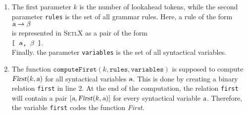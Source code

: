 \begin{enumerate}
\item The first parameter $k$ is the number of lookahead tokens, while the second parameter
      \texttt{rules} is the set of all grammar rules. Here, a rule of the form
      \\[0.2cm]
      \hspace*{1.3cm}
      $\textsl{a} \rightarrow \beta$
      \\[0.2cm]
      is represented in \textsc{SetlX} as a pair of the form
      \\[0.2cm]
      \hspace*{1.3cm}
      \texttt{[ $\textsl{a}$, $\beta$ ]}.
      \\[0.2cm]
      Finally. the parameter \texttt{variables} is the set of all syntactical variables.
\item The function $\texttt{computeFirst}(k, \texttt{rules}, \mathtt{variables})$ is supposed to compute
      $\textsl{First}(k, \textsl{a})$ for all syntactical variables $\textsl{a}$.  This is done by creating a binary
      relation \texttt{first} in line 2.  At the end of the computation, the relation
      \texttt{first} will contain a pair $[\textsl{a}, \textsl{First}(k,\textsl{a})]$ for every syntactical variable
      $\textsl{a}$.  Therefore, the variable \texttt{first} codes the function \textsl{First}.


\end{enumerate}
